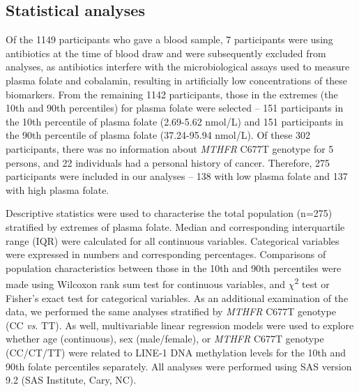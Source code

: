\subsection{Statistical analyses} %
\noindent Of the 1149 participants who gave a blood sample, 7 participants were using antibiotics at the time of blood draw and were subsequently excluded from analyses, as antibiotics interfere with the microbiological assays used to measure plasma folate and cobalamin, resulting in artificially low concentrations of these biomarkers. From the remaining 1142 participants, those in the extremes (the 10th and 90th percentiles) for plasma folate were selected -- 151 participants in the 10th percentile of plasma folate (2.69-5.62 nmol/L) and 151 participants in the 90th percentile of plasma folate (37.24-95.94 nmol/L). Of these 302 participants, there was no information about \emph{MTHFR} C677T genotype for 5 persons, and 22 individuals had a personal history of cancer. Therefore, 275 participants were included in our analyses -- 138 with low plasma folate and 137 with high plasma folate.

\noindent Descriptive statistics were used to characterise the total population (n=275) stratified by extremes of plasma folate. Median and corresponding interquartile range (IQR) were calculated for all continuous variables. Categorical variables were expressed in numbers and corresponding percentages. Comparisons of population characteristics between those in the 10th and 90th percentiles were made using Wilcoxon rank sum test for continuous variables, and $\chi$\textsuperscript{2} test or Fisher's exact test for categorical variables. As an additional examination of the data, we performed the same analyses stratified by \emph{MTHFR} C677T genotype (CC \emph{vs}. TT). As well, multivariable linear regression models were used to explore whether age (continuous), sex (male/female), or \emph{MTHFR} C677T genotype (CC/CT/TT) were related to LINE-1 DNA methylation levels for the 10th and 90th folate percentiles separately. All analyses were performed using SAS version 9.2 (SAS Institute, Cary, NC).

